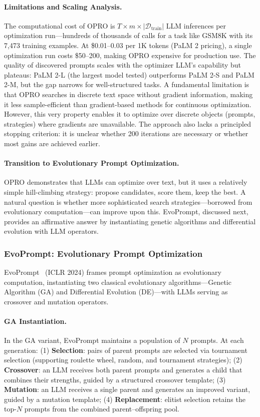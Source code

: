\paragraph{Limitations and Scaling Analysis.}
The computational cost of OPRO is $T \times m \times |\mathcal{D}_{\text{train}}|$ LLM inferences per optimization run---hundreds of thousands of calls for a task like GSM8K with its 7,473 training examples. At \$0.01--0.03 per 1K tokens (PaLM 2 pricing), a single optimization run costs \$50--200, making OPRO expensive for production use. The quality of discovered prompts scales with the optimizer LLM's capability but plateaus: PaLM 2-L (the largest model tested) outperforms PaLM 2-S and PaLM 2-M, but the gap narrows for well-structured tasks. A fundamental limitation is that OPRO searches in discrete text space without gradient information, making it less sample-efficient than gradient-based methods for continuous optimization. However, this very property enables it to optimize over discrete objects (prompts, strategies) where gradients are unavailable. The approach also lacks a principled stopping criterion: it is unclear whether 200 iterations are necessary or whether most gains are achieved earlier.

\paragraph{Transition to Evolutionary Prompt Optimization.}
OPRO demonstrates that LLMs can optimize over text, but it uses a relatively simple hill-climbing strategy: propose candidates, score them, keep the best. A natural question is whether more sophisticated search strategies---borrowed from evolutionary computation---can improve upon this. EvoPrompt, discussed next, provides an affirmative answer by instantiating genetic algorithms and differential evolution with LLM operators.


\subsubsection{EvoPrompt: Evolutionary Prompt Optimization}

EvoPrompt~\citep{evoprompt2024} (ICLR 2024) frames prompt optimization as evolutionary computation, instantiating two classical evolutionary algorithms---Genetic Algorithm (GA) and Differential Evolution (DE)---with LLMs serving as crossover and mutation operators.

\paragraph{GA Instantiation.}
In the GA variant, EvoPrompt maintains a population of $N$ prompts. At each generation: (1) \textbf{Selection}: pairs of parent prompts are selected via tournament selection (supporting roulette wheel, random, and tournament strategies); (2) \textbf{Crossover}: an LLM receives both parent prompts and generates a child that combines their strengths, guided by a structured crossover template; (3) \textbf{Mutation}: an LLM receives a single parent and generates an improved variant, guided by a mutation template; (4) \textbf{Replacement}: elitist selection retains the top-$N$ prompts from the combined parent--offspring pool.

